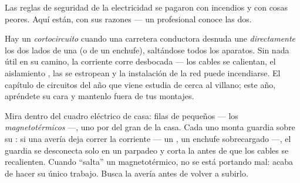 Las reglas de seguridad de la electricidad se pagaron con incendios y
con cosas peores. Aquí están, con sus razones --- un profesional
conoce las dos.

\begin{definition}[Cortocircuito]\label{def:g6:circuits-and-safety:short}
Hay un \emph{cortocircuito} cuando una carretera
conductora desnuda une \emph{directamente} los dos lados de una
 (o de un enchufe), saltándose todos los aparatos. Sin nada
útil en su camino, la corriente corre desbocada --- los cables
se calientan, el aislamiento , las  se
estropean y la instalación de la red puede incendiarse. El capítulo de
circuitos del año que viene estudia de cerca al villano; este año,
apréndete su cara y mantenlo fuera de tus montajes.
\end{definition}

\begin{remark}\label{rem:g6:circuits-and-safety:guards}
Mira dentro del cuadro eléctrico de casa: filas de
 pequeños --- los \emph{magnetotérmicos} ---, uno por
 del gran  de la casa. Cada uno
monta guardia sobre su : si una avería deja correr la corriente
--- un , un enchufe sobrecargado ---, el guardia se
desconecta solo en un parpadeo y corta la  antes de que los
cables se recalienten. Cuando ``salta'' un magnetotérmico, no se está
portando mal: acaba de hacer su único trabajo. Busca la avería antes
de volver a subirlo.
\end{remark}

